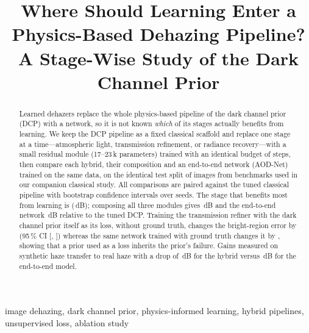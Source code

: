 \documentclass[conference]{IEEEtran}
\begin{document}
\title{Where Should Learning Enter a Physics-Based Dehazing Pipeline?\\
A Stage-Wise Study of the Dark Channel Prior}

\author{
}
\maketitle

\begin{abstract}
Learned dehazers replace the whole physics-based pipeline of the dark channel prior (DCP) with a network, so it is not
known \emph{which} of its stages actually benefits from learning. We keep the DCP pipeline as a fixed classical scaffold and
replace one stage at a time---atmospheric light, transmission refinement, or radiance recovery---with a small residual
module (17--23\,k parameters) trained with an identical budget of \hybSteps{} steps, then compare each hybrid, their
composition and an end-to-end network (AOD-Net) trained on the same data, on the identical test split of
\hybNTest{} images from \nDatasets{} benchmarks used in our companion classical study. All comparisons are paired against the
tuned classical pipeline with bootstrap confidence intervals over \hybSeeds{} seeds. The stage that benefits most from
learning is \hybBestStage{} (\hybBestStageGain{}\,dB); composing all three modules gives \hybHAllDelta{}\,dB and the
end-to-end network \hybAodDelta{}\,dB relative to the tuned DCP. Training the transmission refiner with the dark
channel prior itself as its loss, without ground truth, changes the bright-region error by \hybHTpriorBDelta{}
(95\,\% CI [\hybHTpriorBLo, \hybHTpriorBHi]) whereas the same network trained with ground truth changes it by
\hybHTsupBDelta{}, showing that a prior used as a loss inherits the prior's failure. Gains measured on synthetic haze
transfer to real haze with a drop of \hybHAllDrop{}\,dB for the hybrid versus \hybAodDrop{}\,dB for the end-to-end
model.
\end{abstract}

\begin{IEEEkeywords}
image dehazing, dark channel prior, physics-informed learning, hybrid pipelines, unsupervised loss, ablation study
\end{IEEEkeywords}
\end{document}
